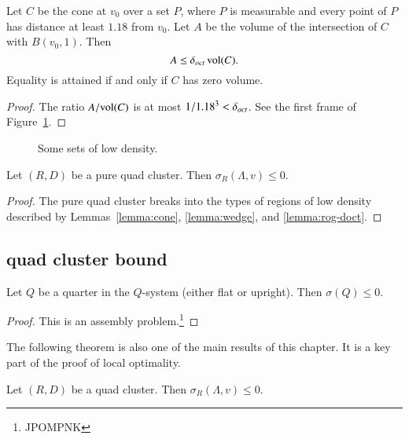 \begin{lemma} \label{lemma:cone}
Let $C$ be the cone at $v_0$ over a set $P$, where $P$ is
measurable and every point of $P$ has distance at least $1.18$
from $v_0$.  Let $A$ be the volume of the intersection of $C$
with $B(v_0,1)$. Then
    $$A\le\delta_{oct}\,{\operatorname{vol}}(C).$$
Equality is attained if and only if $C$ has zero volume.
\end{lemma}

\begin{proof} The ratio $A/{\operatorname{vol}}(C)$ is at most $1/1.18^3 < \delta_{oct}$.   See the
first frame of Figure~\ref{fig:doct}.
\end{proof}

\begin{figure}[htb]
  \centering
  \caption{Some sets of low density.}
  \label{fig:doct}
\end{figure}

\begin{lemma}\label{lemma:pure0}
Let $(R,D)$ be a pure quad cluster.  Then
  $\sigma_R(\Lambda,v)\le 0$.
\end{lemma}

\begin{proof}  The pure quad cluster breaks into the types
of regions of low density described by Lemmas~\ref{lemma:cone},
\ref{lemma:wedge}, and \ref{lemma:rog-doct}.
\end{proof}




\subsection{quad cluster bound}

\begin{lemma} \label{lemma:quarter0}
Let $Q$ be a quarter in the $Q$-system (either flat or upright).
Then $\sigma(Q)\le 0$. 
\end{lemma}

\begin{proof} This is an assembly problem.\footnote{JPOMPNK}
\end{proof}


The following theorem is also one of the main results of this
chapter. It is a key part of the proof of local optimality.


\begin{theorem}\label{lemma:quad0} Let $(R,D)$ be a quad cluster.
Then $\sigma_R(\Lambda,v)\le 0$.
\end{theorem}

